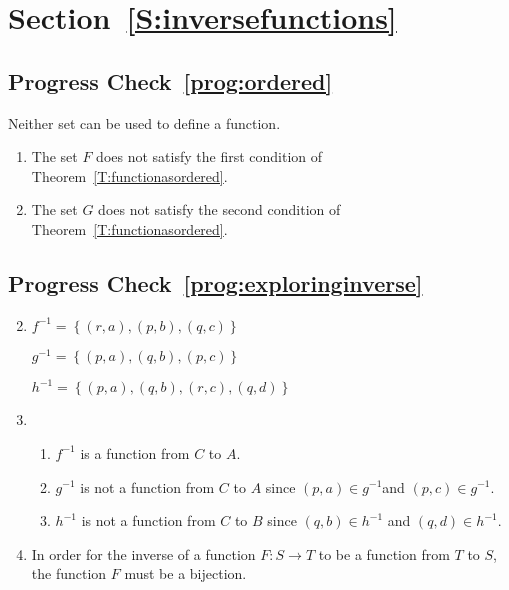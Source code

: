 \section*{Section~\ref{S:inversefunctions}}

\subsection*{Progress Check~\ref{prog:ordered}}
Neither set can be used to define a function.
\begin{enumerate}
\item The set $F$ does not satisfy the first condition of Theorem~\ref{T:functionasordered}.
\item The set $G$ does not satisfy the second condition of Theorem~\ref{T:functionasordered}.
\end{enumerate}



\subsection*{Progress Check~\ref{prog:exploringinverse}}
\begin{enumerate} \setcounter{enumi}{1}
\item \begin{multicols}{2}
$f^{ - 1}  = \left\{ {( {r, a} ), ( {p, b} ), ( {q, c} )} \right\}$

$g^{ - 1}  = \left\{ {( {p, a} ), ( {q, b} ), ( {p, c} )} \right\}$

$h^{ - 1}  = \left\{ {( {p, a} ), ( {q, b} ), ( {r, c} ), ( {q, d} )} \right\}$
\end{multicols}

\item \begin{enumerate}
\item $f^{ - 1} $ is a function from  $C$  to  $A$.  

\item $g^{ - 1} $ is not a function from  $C$  to  $A$  since  
$( {p, a} ) \in g^{ - 1} $and  $( {p, c} ) \in g^{ - 1} $.

\item $h^{ - 1} $  is not a function from  $C$  to  $B$  since  
$( {q, b} ) \in h^{ - 1} $  and  $( {q, d} ) \in h^{ - 1} $.
\end{enumerate}

\addtocounter{enumi}{1}
\item In order for the inverse of a function  $F:S \to T$ to be a function  from  $T$  to  $S$, the function  $F$  must be a bijection.
\end{enumerate}

\hbreak
\newpage

\endinput

